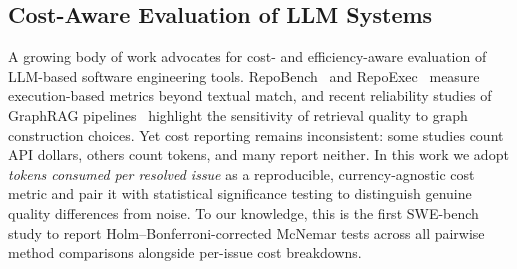 \subsection{Cost-Aware Evaluation of LLM Systems}

A growing body of work advocates for cost- and efficiency-aware evaluation of LLM-based software engineering tools. RepoBench~\cite{repobench2024} and RepoExec~\cite{repoexec2024} measure execution-based metrics beyond textual match, and recent reliability studies of GraphRAG pipelines~\cite{reliablegraphrag2026} highlight the sensitivity of retrieval quality to graph construction choices. Yet cost reporting remains inconsistent: some studies count API dollars, others count tokens, and many report neither. In this work we adopt \emph{tokens consumed per resolved issue} as a reproducible, currency-agnostic cost metric and pair it with statistical significance testing to distinguish genuine quality differences from noise. To our knowledge, this is the first SWE-bench study to report Holm--Bonferroni-corrected McNemar tests across all pairwise method comparisons alongside per-issue cost breakdowns.
